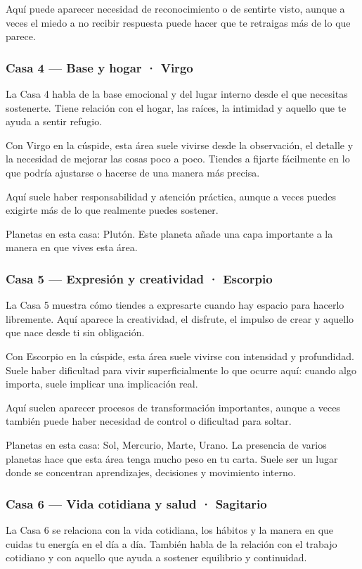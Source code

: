 \documentclass[11pt,a4paper]{article}
\begin{document}
Aquí puede aparecer necesidad de reconocimiento o de sentirte visto, aunque a veces el miedo a no recibir respuesta puede hacer que te retraigas más de lo que parece.

\subsubsection*{Casa 4 — Base y hogar · Virgo}
La Casa 4 habla de la base emocional y del lugar interno desde el que necesitas sostenerte. Tiene relación con el hogar, las raíces, la intimidad y aquello que te ayuda a sentir refugio.

Con Virgo en la cúspide, esta área suele vivirse desde la observación, el detalle y la necesidad de mejorar las cosas poco a poco. Tiendes a fijarte fácilmente en lo que podría ajustarse o hacerse de una manera más precisa.

Aquí suele haber responsabilidad y atención práctica, aunque a veces puedes exigirte más de lo que realmente puedes sostener.

Planetas en esta casa: Plutón. Este planeta añade una capa importante a la manera en que vives esta área.

\subsubsection*{Casa 5 — Expresión y creatividad · Escorpio}
La Casa 5 muestra cómo tiendes a expresarte cuando hay espacio para hacerlo libremente. Aquí aparece la creatividad, el disfrute, el impulso de crear y aquello que nace desde ti sin obligación.

Con Escorpio en la cúspide, esta área suele vivirse con intensidad y profundidad. Suele haber dificultad para vivir superficialmente lo que ocurre aquí: cuando algo importa, suele implicar una implicación real.

Aquí suelen aparecer procesos de transformación importantes, aunque a veces también puede haber necesidad de control o dificultad para soltar.

Planetas en esta casa: Sol, Mercurio, Marte, Urano. La presencia de varios planetas hace que esta área tenga mucho peso en tu carta. Suele ser un lugar donde se concentran aprendizajes, decisiones y movimiento interno.

\subsubsection*{Casa 6 — Vida cotidiana y salud · Sagitario}
La Casa 6 se relaciona con la vida cotidiana, los hábitos y la manera en que cuidas tu energía en el día a día. También habla de la relación con el trabajo cotidiano y con aquello que ayuda a sostener equilibrio y continuidad.
\end{document}
